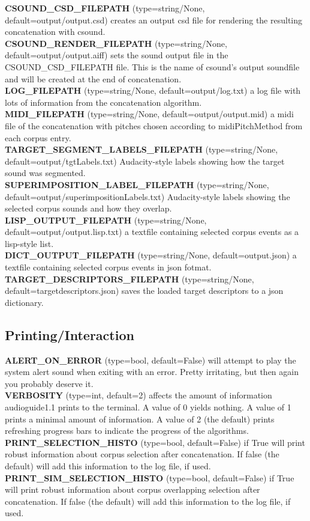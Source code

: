 \documentclass{article}
\newcommand{\optEntry}[4]{\textbf{#1} (type=#2, default=#3) #4\hspace{0.5em}\\}
\newcommand{\ag}{audioguide1.1 }
\begin{document}
\begin{spacing}{1.2}
\optEntry{CSOUND\_CSD\_FILEPATH}{string/None}{output/output.csd}{creates an output csd file for rendering the resulting concatenation with csound.}

\optEntry{CSOUND\_RENDER\_FILEPATH}{string/None}{output/output.aiff}{sets the sound output file in the CSOUND\_CSD\_FILEPATH file.  This is the name of csound's output soundfile and will be created at the end of concatenation.}

\optEntry{LOG\_FILEPATH}{string/None}{output/log.txt}{a log file with lots of information from the concatenation algorithm.}

\optEntry{MIDI\_FILEPATH}{string/None}{output/output.mid}{a midi file of the concatenation with pitches chosen according to midiPitchMethod from each corpus entry.}

\optEntry{TARGET\_SEGMENT\_LABELS\_FILEPATH}{string/None}{output/tgtLabels.txt}{Audacity-style labels showing how the target sound was segmented.}

\optEntry{SUPERIMPOSITION\_LABEL\_FILEPATH}{string/None}{output/superimpositionLabels.txt}{Audacity-style labels showing the selected corpus sounds and how they overlap.}

\optEntry{LISP\_OUTPUT\_FILEPATH}{string/None}{output/output.lisp.txt}{a textfile containing selected corpus events as a lisp-style list.}

\optEntry{DICT\_OUTPUT\_FILEPATH}{string/None}{output.json}{a textfile containing selected corpus events in json fotmat.}

\optEntry{TARGET\_DESCRIPTORS\_FILEPATH}{string/None}{targetdescriptors.json}{saves the loaded target descriptors to a json dictionary.}


\subsection{Printing/Interaction}
\optEntry{ALERT\_ON\_ERROR}{bool}{False}{will attempt to play the system alert sound when exiting with an error.  Pretty irritating, but then again you probably deserve it.}

\optEntry{VERBOSITY}{int}{2}{affects the amount of information \ag prints to the terminal.  A value of 0 yields nothing.  A value of 1 prints a minimal amount of information.  A value of 2 (the default) prints refreshing progress bars to indicate the progress of the algorithms.}

\optEntry{PRINT\_SELECTION\_HISTO}{bool}{False}{if True will print robust information about corpus selection after concatenation.  If false (the default) will add this information to the log file, if used.}

\optEntry{PRINT\_SIM\_SELECTION\_HISTO}{bool}{False}{if True will print robust information about corpus overlapping selection after concatenation.  If false (the default) will add this information to the log file, if used.}



\end{spacing}
\end{document}
